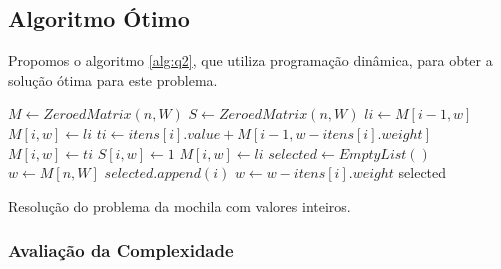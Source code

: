 \documentclass[a4paper]{article}
\begin{document}
\subsection{Algoritmo Ótimo}

Propomos o algoritmo \ref{alg:q2}, que utiliza programação dinâmica, para obter a solução ótima para este problema.

\begin{algorithm}[H]
\begin{algorithmic}[1]
    \State {} \label{alg:q2:init:start}
    \State $M \gets ZeroedMatrix(n, W)$ 
    \State $S \gets ZeroedMatrix(n, W)$  \label{alg:q2:init:end}
    \State {} \label{alg:q2:calcopt:start}
        \State $li \gets M[i - 1, w]$ 
          \State $M[i, w] \gets li$
        \Else
          \State {}
          \State $ti \gets itens[i].value + M[i- 1, w - itens[i].weight]$
            \State $M[i, w] \gets ti$
            \State $S[i, w] \gets 1$ 
          \Else
            \State $M[i, w] \gets li$
          \EndIf
        \EndIf
      \EndFor
    \EndFor \label{alg:q2:calcopt:end}
    \State {} \label{alg:q2:select:start}
    \State $selected \gets EmptyList()$
    \State $w \gets M[n, W]$
        \State $selected.append(i)$
        \State $w \gets w - itens[i].weight$
      \EndIf
    \EndFor
    \State \Return selected \label{alg:q2:select:end}
  \EndFunction
\end{algorithmic}
\caption{Resolução do problema da mochila com valores inteiros.}
\label{alg:q2}
\end{algorithm}

\subsubsection{Avaliação da Complexidade}
\end{document}
